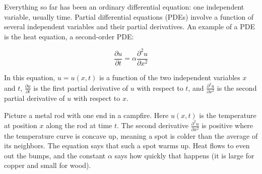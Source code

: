 Everything so far has been an ordinary differential equation: one
independent variable, usually time. Partial differential equations (PDEs) involve a
function of several independent variables and their partial
derivatives. An example of a PDE is the heat equation, a second-order
PDE: 

\begin{equation}
\frac{\partial u}{\partial t} = \alpha \frac{\partial^2 u}{\partial x^2}
\end{equation}

In this equation, $u = u(x, t)$ is a function of the two independent
variables $x$ and $t$, $\frac{\partial u}{\partial t}$ is the first
partial derivative of $u$ with respect to $t$, and $\frac{\partial^2
  u}{\partial x^2}$ is the second partial derivative of $u$ with
respect to $x$.

Picture a metal rod with one end in a campfire. Here $u(x,t)$ is the
temperature at position $x$ along the rod at time $t$. The second derivative
$\frac{\partial^2 u}{\partial x^2}$ is positive where the temperature curve is
concave up, meaning a spot is colder than the average of its neighbors. The
equation says that such a spot warms up. Heat flows to even out the bumps, and
the constant $\alpha$ says how quickly that happens (it is large for copper
and small for wood).


